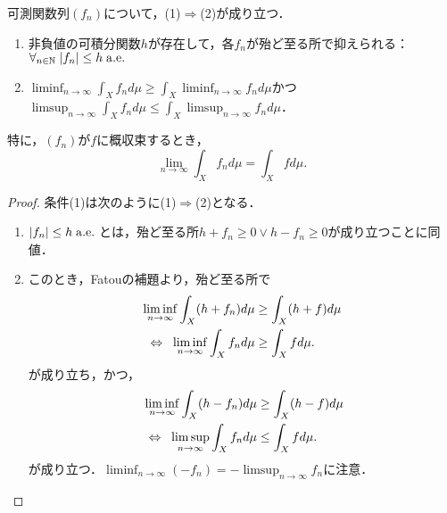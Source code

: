 \documentclass[uplatex, dvipdfmx]{jsreport}
\begin{document}
\begin{theorem}\label{thm-Lebesgue-convergence-theorem}
    可測関数列$(f_n)$について，(1)$\Rightarrow$(2)が成り立つ．
    \begin{enumerate}
        \item 非負値の可積分関数$h$が存在して，各$f_n$が殆ど至る所で抑えられる：$\forall_{n\in\mathbb{N}}\;\lvert f_n\rvert\le h\;\mathrm{a.e.}\;$
        \item $\liminf_{n\to\infty}\int_Xf_nd\mu\ge\int_X\liminf_{n\to\infty}f_nd\mu$かつ$\limsup_{n\to\infty}\int_Xf_nd\mu\le\int_X\limsup_{n\to\infty}f_nd\mu$．
    \end{enumerate}
    特に，$(f_n)$が$f$に概収束するとき，
    \[\lim_{n\to\infty}\int_Xf_nd\mu=\int_Xfd\mu.\]
\end{theorem}
\begin{proof}
    条件(1)は次のように(1)$\Rightarrow$(2)となる．
    \begin{enumerate}
        \item $\lvert f_n\rvert\le h\;\mathrm{a.e.}\;$とは，殆ど至る所$h+f_n\ge 0\lor h-f_n\ge 0$が成り立つことに同値．
        \item このとき，Fatouの補題より，殆ど至る所で
        \begin{align*}
            \liminf_{n\to\infty}\int_X(h+f_n)d\mu&\ge\int_X(h+f)d\mu\\
            \;\;\Leftrightarrow\;\;\liminf_{n\to\infty}\int_Xf_nd\mu&\ge\int_Xfd\mu.
        \end{align*}
        が成り立ち，かつ，
        \begin{align*}
            \liminf_{n\to\infty}\int_X(h-f_n)d\mu&\ge\int_X(h-f)d\mu\\
            \;\;\Leftrightarrow\;\;\limsup_{n\to\infty}\int_Xf_nd\mu&\le\int_Xfd\mu.
        \end{align*}
        が成り立つ．$\liminf_{n\to\infty}(-f_n)=-\limsup_{n\to\infty}f_n$に注意．
    \end{enumerate}
\end{proof}
\end{document}

